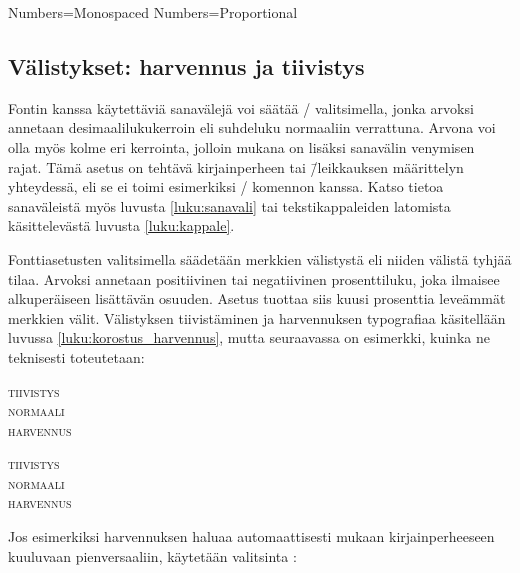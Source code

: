 \begin{koodilohkosis}
  Numbers=Monospaced   %
  Numbers=Proportional %
\end{koodilohkosis}

\subsection{Välistykset: harvennus ja tiivistys}
\label{luku:fontit_valistys}

Fontin kanssa käytettäviä sanavälejä voi säätää \-/
valitsimella, jonka arvoksi annetaan desimaalilukukerroin eli suhdeluku
normaaliin verrattuna. Arvona voi olla myös kolme eri kerrointa, jolloin
mukana on lisäksi sanavälin venymisen rajat. Tämä asetus on tehtävä
kirjainperheen tai \=/leikkauksen määrittelyn yhteydessä, eli se ei
toimi esimerkiksi \-/ komennon kanssa. Katso
tietoa sanaväleistä myös luvusta \ref{luku:sanavali} tai
tekstikappaleiden latomista käsittelevästä luvusta \ref{luku:kappale}.
\noclub[2]

Fonttiasetusten valitsimella  säädetään merkkien
välistystä eli niiden välistä tyhjää tilaa. Arvoksi annetaan
positiivinen tai negatiivinen prosenttiluku, joka ilmaisee alkuperäiseen
lisättävän osuuden. Asetus  tuottaa siis
kuusi prosenttia leveämmät merkkien välit. Välistyksen tiivistäminen ja
harvennuksen typografiaa käsitellään luvussa
\ref{luku:korostus_harvennus}, mutta seuraavassa on esimerkki, kuinka ne
teknisesti toteutetaan:

\begin{koodilohkosis}
  \scshape { tiivistys} \\
  normaali \\ { harvennus}
\end{koodilohkosis}

\begin{tulossis}
  \scshape { tiivistys} \\
  normaali \\ { harvennus}
\end{tulossis}

Jos esimerkiksi harvennuksen haluaa automaattisesti mukaan
kirjainperheeseen kuuluvaan pienversaaliin, käytetään valitsinta
:

